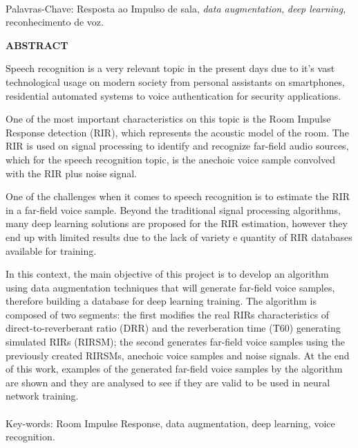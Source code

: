 \paragraph{}
\noindent Palavras-Chave: Resposta ao Impulso de sala, \textit{data augmentation}, \textit{deep learning}, reconhecimento de voz.

\pagebreak


\begin{center}
\textbf{ABSTRACT}
\end{center}
      \vspace{0.5cm}

Speech recognition is a very relevant topic in the present days due to it's vast technological usage on modern society
from personal assistants on smartphones, residential automated systems to voice authentication for security applications.

One of the most important characteristics on this topic is the Room Impulse Response detection (RIR), which represents the
acoustic model of the room. The RIR is used on signal processing to identify and recognize far-field audio sources,
which for the speech recognition topic, is the anechoic voice sample convolved with the RIR plus noise signal.

One of the challenges when it comes to speech recognition is to estimate the RIR in a far-field voice sample.
Beyond the traditional signal processing algorithms, many deep learning solutions are proposed for the RIR estimation,
however they end up with limited results due to the lack of variety e quantity of RIR databases available for training.

In this context, the main objective of this project is to develop an algorithm using data augmentation techniques that will
generate far-field voice samples, therefore building a database for deep learning training.
The algorithm is composed of two segments: the first modifies the real RIRs characteristics of direct-to-reverberant ratio (DRR) and
the reverberation time (T60) generating simulated RIRs (RIRSM); the second generates far-field voice samples using the previously created 
RIRSMs, anechoic voice samples and noise signals.
At the end of this work, examples of the generated far-field voice samples by the algorithm are shown and they are analysed to see
if they are valid to be used in neural network training.

\paragraph{}
\noindent Key-words: Room Impulse Response, data augmentation, deep learning, voice recognition.

